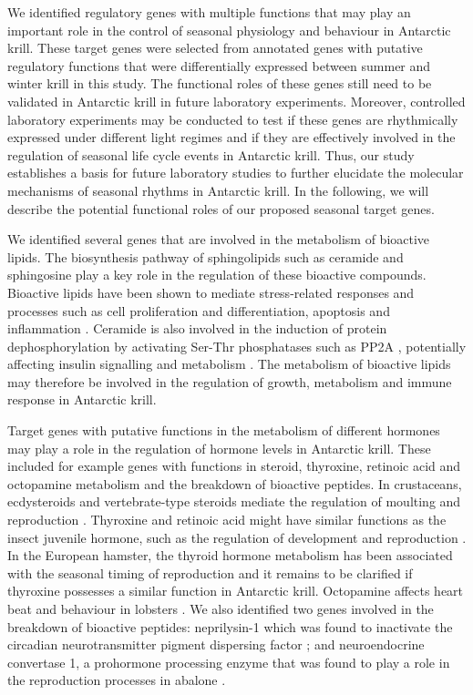 We identified regulatory genes with multiple functions that may play an
important role in the control of seasonal physiology and behaviour in Antarctic
krill. These target genes were selected from annotated genes with putative
regulatory functions that were differentially expressed between summer and
winter krill in this study. The functional roles of these genes still need to
be validated in Antarctic krill in future laboratory experiments. Moreover,
controlled laboratory experiments may be conducted to test if these genes are
rhythmically expressed under different light regimes and if they are
effectively involved in the regulation of seasonal life cycle events in
Antarctic krill. Thus, our study establishes a basis for future laboratory
studies to further elucidate the molecular mechanisms of seasonal rhythms in
Antarctic krill. In the following, we will describe the potential functional
roles of our proposed seasonal target genes. 

We identified several genes that are involved in the metabolism of bioactive
lipids. The biosynthesis pathway of sphingolipids such as ceramide and
sphingosine play a key role in the regulation of these bioactive compounds.
Bioactive lipids have been shown to mediate stress-related responses and
processes such as cell proliferation and differentiation, apoptosis and
inflammation \citep{hannun_principles_2008}. Ceramide is also involved in the
induction of protein dephosphorylation by activating Ser-Thr phosphatases such
as PP2A \citep{chalfant_structural_2004}, potentially affecting insulin
signalling and metabolism \citep{hannun_principles_2008}. The metabolism of
bioactive lipids may therefore be involved in the regulation of growth,
metabolism and immune response in Antarctic krill.

Target genes with putative functions in the metabolism of different hormones
may play a role in the regulation of hormone levels in Antarctic krill. These
included for example genes with functions in steroid, thyroxine, retinoic acid
and octopamine metabolism and the breakdown of bioactive peptides. In
crustaceans, ecdysteroids and vertebrate-type steroids mediate the regulation
of moulting and reproduction \citep{lafont_steroids_2007}. Thyroxine and
retinoic acid might have similar functions as the insect juvenile hormone, such
as the regulation of development and reproduction \citep{laufer_unifying_2001}.
In the European hamster, the thyroid hormone metabolism has been associated
with the seasonal timing of reproduction \citep{saenzdemiera_circannual_2014}
and it remains to be clarified if thyroxine possesses a similar function in
Antarctic krill.  Octopamine affects heart beat and behaviour in lobsters
\citep{battelle_targets_1978, kravitz_hormonal_1988}. We also identified two
genes involved in the breakdown of bioactive peptides: neprilysin-1 which was
found to inactivate the circadian neurotransmitter pigment dispersing factor
\citep{isaac_metabolic_2007}; and neuroendocrine convertase 1, a prohormone
processing enzyme that was found to play a role in the reproduction processes
in abalone \citep{zhou_molecular_2010}.

